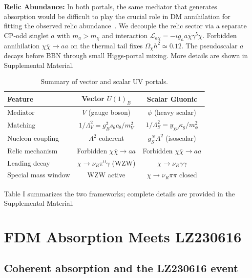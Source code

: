 \documentclass[aps,twocolumn,superscriptaddress,groupedaddress,nofootinbib,floatfix]{revtex4}
\begin{document}
\textbf{Relic Abundance:} In both portals, the same mediator that generates absorption would be difficult to play the crucial role in DM annihilation for fitting the observed relic abundance~\cite{Cox:2023cjw}. We decouple the relic sector via a separate CP-odd singlet $a$ with $m_a>m_\chi$ and interaction $\mathcal{L}_{a\chi}=-ig_a a\bar{\chi}\gamma^5\chi$. Forbidden annihilation $\chi\bar\chi\to aa$ on the thermal tail fixes $\Omega_\chi h^2\simeq0.12$. The pseudoscalar $a$ decays before BBN through small Higgs-portal mixing. More details are shown in Supplemental Material.

\begin{table}[h]
\centering
\caption{Summary of vector and scalar UV portals.}
\label{tab:models}
\begin{tabular}{lcc}
\toprule
Feature & Vector $U(1)_B$ & Scalar Gluonic \\
\midrule
Mediator & $V$ (gauge boson) & $\phi$ (heavy scalar) \\
Matching & $1/\Lambda_V^2=g_B^2s_\theta c_\theta/m_V^2$ & $1/\Lambda_S^2=y_{\chi\nu}\kappa_g/m_\phi^2$ \\
Nucleon coupling & $A^2$ coherent & $g_S^N A^2$ (isoscalar) \\
Relic mechanism & Forbidden $\chi\bar\chi\to aa$ & Forbidden $\chi\bar\chi\to aa$ \\
Leading decay & $\chi\to\nu_R\pi^0\gamma$ (WZW) & $\chi\to\nu_R\gamma\gamma$ \\
Special mass window & WZW active & $\chi\to\nu_R\pi\pi$ closed \\
\bottomrule
\end{tabular}
\end{table}

Table I summarizes the two frameworks; complete details are provided in the Supplemental Material.


\section{FDM Absorption Meets LZ230616}
\label{sec:results}

\subsection{Coherent absorption and the LZ230616 event}
\end{document}
